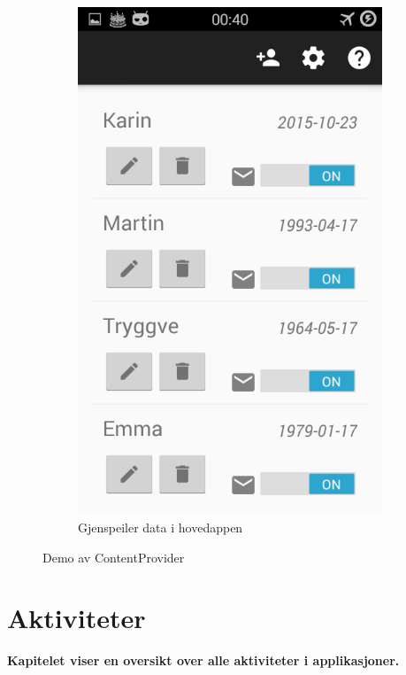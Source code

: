 \begin{figure}[ht]
\begin{subfigure}[b]{0.35\textwidth}
        \includegraphics[width=\textwidth]{./img/12.png}
        \caption{Gjenspeiler data i hovedappen}
        \label{fig:test_hovedapp}
    \end{subfigure}
    \caption{Demo av ContentProvider}
    \label{fig:content_provider}
\end{figure}




\chapter{Aktiviteter}
\textbf{Kapitelet viser en oversikt over alle aktiviteter i applikasjoner. }

